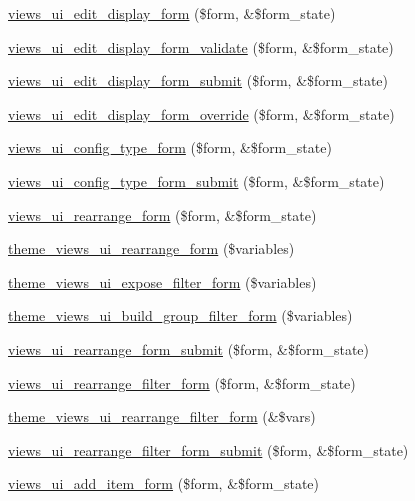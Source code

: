 \begin{DoxyCompactItemize}
\item 
\hyperlink{admin_8inc_a82ff573180aaa1d543da73179c22b610}{views\_\-ui\_\-edit\_\-display\_\-form} (\$form, \&\$form\_\-state)
\item 
\hyperlink{admin_8inc_aa266b14e787266b24a7096f58d41667c}{views\_\-ui\_\-edit\_\-display\_\-form\_\-validate} (\$form, \&\$form\_\-state)
\item 
\hyperlink{admin_8inc_a2272bcea1334751c9c2e8d6b04ae64af}{views\_\-ui\_\-edit\_\-display\_\-form\_\-submit} (\$form, \&\$form\_\-state)
\item 
\hyperlink{admin_8inc_a5d8a67bc769fcccdad46636e063079d2}{views\_\-ui\_\-edit\_\-display\_\-form\_\-override} (\$form, \&\$form\_\-state)
\item 
\hyperlink{admin_8inc_a72b3d556016a888d02199f15fa72a74d}{views\_\-ui\_\-config\_\-type\_\-form} (\$form, \&\$form\_\-state)
\item 
\hyperlink{admin_8inc_a61be3ab41a05febb0ec4c994beaf0b69}{views\_\-ui\_\-config\_\-type\_\-form\_\-submit} (\$form, \&\$form\_\-state)
\item 
\hyperlink{admin_8inc_a9f3001cf0f6d1faa6c3dd6b36482fb29}{views\_\-ui\_\-rearrange\_\-form} (\$form, \&\$form\_\-state)
\item 
\hyperlink{admin_8inc_a3e19a044f97ed6ce2b6c70a15d37e587}{theme\_\-views\_\-ui\_\-rearrange\_\-form} (\$variables)
\item 
\hyperlink{admin_8inc_ae4523318a5b631ba1357200309ec8136}{theme\_\-views\_\-ui\_\-expose\_\-filter\_\-form} (\$variables)
\item 
\hyperlink{admin_8inc_a521b64567d1306471b60dd4cd328d195}{theme\_\-views\_\-ui\_\-build\_\-group\_\-filter\_\-form} (\$variables)
\item 
\hyperlink{admin_8inc_a6cc534f5a5904b1b21333fb063836be7}{views\_\-ui\_\-rearrange\_\-form\_\-submit} (\$form, \&\$form\_\-state)
\item 
\hyperlink{admin_8inc_aabfbb223593fede3af3dad2a87579505}{views\_\-ui\_\-rearrange\_\-filter\_\-form} (\$form, \&\$form\_\-state)
\item 
\hyperlink{admin_8inc_a1e764180aedf514cabd8a67e6f311151}{theme\_\-views\_\-ui\_\-rearrange\_\-filter\_\-form} (\&\$vars)
\item 
\hyperlink{admin_8inc_a6738d9e2d6b0bc17b8c07791a000c961}{views\_\-ui\_\-rearrange\_\-filter\_\-form\_\-submit} (\$form, \&\$form\_\-state)
\item 
\hyperlink{admin_8inc_a60af2b1fd57c814bbae32de066b8b1d7}{views\_\-ui\_\-add\_\-item\_\-form} (\$form, \&\$form\_\-state)

\end{DoxyCompactItemize}
